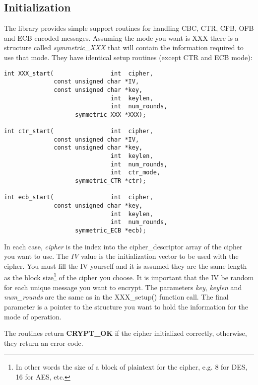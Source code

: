 \documentclass[synpaper]{book}
\begin{document}
\subsection{Initialization}
 
 
The library provides simple support routines for handling CBC, CTR, CFB, OFB and ECB encoded messages.  Assuming the mode 
you want is XXX there is a structure called \textit{symmetric\_XXX} that will contain the information required to
use that mode.  They have identical setup routines (except CTR and ECB mode):
    
\begin{verbatim}
int XXX_start(                int  cipher, 
              const unsigned char *IV, 
              const unsigned char *key, 
                              int  keylen, 
                              int  num_rounds, 
                    symmetric_XXX *XXX);

int ctr_start(                int  cipher,
              const unsigned char *IV,
              const unsigned char *key, 
                              int  keylen,
                              int  num_rounds, 
                              int  ctr_mode,
                    symmetric_CTR *ctr);

int ecb_start(                int  cipher, 
              const unsigned char *key, 
                              int  keylen, 
                              int  num_rounds, 
                    symmetric_ECB *ecb);
\end{verbatim}

In each case, \textit{cipher} is the index into the cipher\_descriptor array of the cipher you want to use.  The \textit{IV} value is 
the initialization vector to be used with the cipher.  You must fill the IV yourself and it is assumed they are the same 
length as the block size\footnote{In other words the size of a block of plaintext for the cipher, e.g. 8 for DES, 16 for AES, etc.} 
of the cipher you choose.  It is important that the IV  be random for each unique message you want to encrypt.  The 
parameters \textit{key}, \textit{keylen} and \textit{num\_rounds} are the same as in the XXX\_setup() function call.  The final parameter 
is a pointer to the structure you want to hold the information for the mode of operation.

The routines return {\bf CRYPT\_OK} if the cipher initialized correctly, otherwise, they return an error code.  
\end{document}
